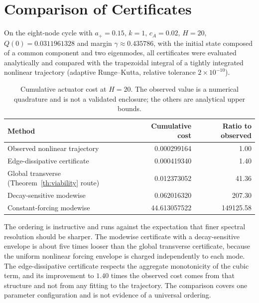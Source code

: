 \documentclass[11pt,notitlepage]{report}
\theoremstyle{definition}
\theoremstyle{remark}
\begin{document}
\section{Comparison of Certificates}
On the eight-node cycle with $a_+=0.15$, $k=1$, $c_A=0.02$, $H=20$, $Q(0)=0.0311961328$ and margin $\gamma\approx0.435786$, with the initial state composed of a common component and two eigenmodes, all certificates were evaluated analytically and compared with the trapezoidal integral of a tightly integrated nonlinear trajectory (adaptive Runge--Kutta, relative tolerance $2\times10^{-10}$).
\begin{table}[ht]\centering\small
\caption{Cumulative actuator cost at $H=20$. The observed value is a numerical quadrature and is not a validated enclosure; the others are analytical upper bounds.}
\begin{tabular}{lrr}\toprule
Method&Cumulative cost&Ratio to observed\\\midrule
Observed nonlinear trajectory&0.000299164&1.00\\
Edge-dissipative certificate&0.000419340&1.40\\
Global transverse (Theorem~\ref{th:viability} route)&0.012373052&41.36\\
Decay-sensitive modewise&0.062016320&207.30\\
Constant-forcing modewise&44.613057522&149125.58\\\bottomrule
\end{tabular}
\end{table}
The ordering is instructive and runs against the expectation that finer spectral resolution should be sharper. The modewise certificate with a decay-sensitive envelope is about five times looser than the global transverse certificate, because the uniform nonlinear forcing envelope is charged independently to each mode. The edge-dissipative certificate respects the aggregate monotonicity of the cubic term, and its improvement to $1.40$ times the observed cost comes from that structure and not from any fitting to the trajectory. The comparison covers one parameter configuration and is not evidence of a universal ordering.
\end{document}
